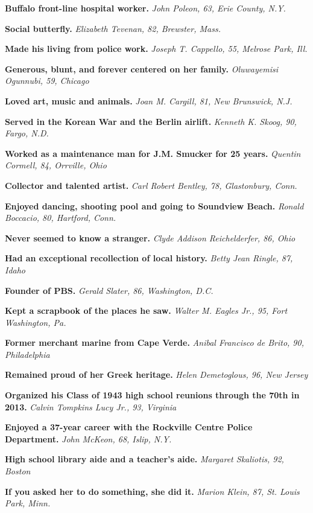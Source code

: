 \textbf{Buffalo front-line hospital worker.} \emph{John Poleon, 63, Erie
County, N.Y.}

\textbf{Social butterfly.} \emph{Elizabeth Tevenan, 82, Brewster, Mass.}

\textbf{Made his living from police work.} \emph{Joseph T. Cappello, 55,
Melrose Park, Ill.}

\textbf{Generous, blunt, and forever centered on her family.}
\emph{Oluwayemisi Ogunnubi, 59, Chicago}

\textbf{Loved art, music and animals.} \emph{Joan M. Cargill, 81, New
Brunswick, N.J.}

\textbf{Served in the Korean War and the Berlin airlift.} \emph{Kenneth
K. Skoog, 90, Fargo, N.D.}

\textbf{Worked as a maintenance man for J.M. Smucker for 25 years.}
\emph{Quentin Cormell, 84, Orrville, Ohio}

\textbf{Collector and talented artist.} \emph{Carl Robert Bentley, 78,
Glastonbury, Conn.}

\textbf{Enjoyed dancing, shooting pool and going to Soundview Beach.}
\emph{Ronald Boccacio, 80, Hartford, Conn.}

\textbf{Never seemed to know a stranger.} \emph{Clyde Addison
Reichelderfer, 86, Ohio}

\textbf{Had an exceptional recollection of local history.} \emph{Betty
Jean Ringle, 87, Idaho}

\textbf{Founder of PBS.} \emph{Gerald Slater, 86, Washington, D.C.}

\textbf{Kept a scrapbook of the places he saw.} \emph{Walter M. Eagles
Jr., 95, Fort Washington, Pa.}

\textbf{Former merchant marine from Cape Verde.} \emph{Anibal Francisco
de Brito, 90, Philadelphia}

\textbf{Remained proud of her Greek heritage.} \emph{Helen Demetoglous,
96, New Jersey}

\textbf{Organized his Class of 1943 high school reunions through the
70th in 2013.} \emph{Calvin Tompkins Lucy Jr., 93, Virginia}

\textbf{Enjoyed a 37-year career with the Rockville Centre Police
Department.} \emph{John McKeon, 68, Islip, N.Y.}

\textbf{High school library aide and a teacher's aide.} \emph{Margaret
Skaliotis, 92, Boston}

\textbf{If you asked her to do something, she did it.} \emph{Marion
Klein, 87, St. Louis Park, Minn.}

